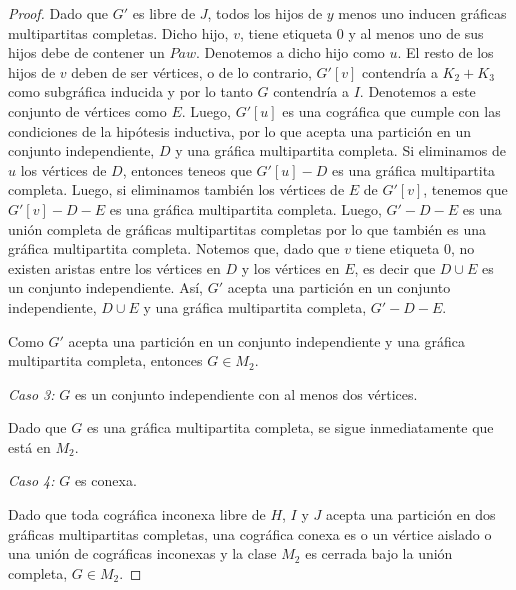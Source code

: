 \begin{proof}
    Dado que $G'$ es libre de $J$, todos los hijos de $y$ menos uno inducen gráficas multipartitas completas. Dicho hijo, $v$, tiene etiqueta 0 y al menos uno de sus hijos debe de contener un $Paw$. Denotemos a dicho hijo como $u$. El resto de los hijos de $v$ deben de ser vértices, o de lo contrario, $G'[v]$ contendría a $K_2 + K_3$ como subgráfica inducida y por lo tanto $G$ contendría a $I$. Denotemos a este conjunto de vértices como $E$. Luego, $G'[u]$  es una cográfica que cumple con las condiciones de la hipótesis inductiva, por lo que acepta una partición en un conjunto independiente, $D$ y una gráfica multipartita completa. Si eliminamos de $u$ los vértices de $D$, entonces teneos que $G'[u] - D$ es una gráfica multipartita completa. Luego, si eliminamos también los vértices de $E$ de $G'[v]$, tenemos que $G'[v]-D-E$ es una gráfica multipartita completa. Luego, $G'-D-E$ es una unión completa de gráficas multipartitas completas por lo que también es una gráfica multipartita completa. Notemos que, dado que $v$ tiene etiqueta 0, no existen aristas entre los vértices en $D$ y los vértices en $E$, es decir que $D \cup E$ es un conjunto independiente. Así, $G'$ acepta una partición en un conjunto independiente, $D \cup E$ y una gráfica multipartita completa, $G' - D - E$. 
    
    
    Como $G'$ acepta una partición en un conjunto independiente y una gráfica multipartita completa, entonces $G \in M_2$.
    
    
    \emph{Caso 3:} $G$ es un conjunto independiente con al menos dos vértices.
    
    Dado que $G$ es una gráfica multipartita completa, se sigue inmediatamente que está en $M_2$.
    
    \emph{Caso 4:} $G$ es conexa.
    
    Dado que toda cográfica inconexa libre de $H$, $I$ y $J$ acepta una partición en dos gráficas multipartitas completas, una cográfica conexa es o un vértice aislado o una unión de cográficas inconexas y la clase $M_2$ es cerrada bajo la unión completa, $G \in M_2$.
    
    
\end{proof}